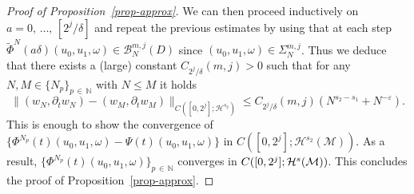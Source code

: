 \documentclass[10pt,a4paper]{article}
\newcommand{\N}{\mathbb{N}}
\newcommand{\B}{\mathcal{B}}
\newcommand{\M}{\mathcal{M}}
\renewcommand{\H}{\mathcal{H}}
\newcommand{\dl}{\delta}
\newcommand{\eps}{\varepsilon}
\newcommand{\Si}{\Sigma}
\newcommand{\wt}{\widetilde}
\newcommand{\dt}{\partial_t}
\renewcommand{\o}{\omega}
\begin{document}
\begin{proof}[Proof of Proposition~\ref{prop-approx}]
We can then proceed inductively on $a=0,\,\dots,\,[2^j/\dl]$ and repeat the previous estimates by using that at each step $\wt\Phi^N(a\dl)(u_0,u_1,\o)\in\B_N^{m,j}(D)$ since $(u_0,u_1,\o)\in \Si_N^{m,j}$. Thus we deduce that there exists a (large) constant $C_{2^j/\dl}(m,j)>0$ such that for any $N,M \in \{N_p\}_{p\,\in\,\N}$ with $N\le M$ it holds
\begin{equation}
\big\|(w_N, \dt w_N)-(w_M,\dt w_M)\big\|_{C\left([0,2^j];\H^{s_2}\right)} \le C_{2^j/\dl}(m,j)\left(N^{s_2-s_1}+N^{-\eps}\right).
\end{equation}
This is enough to show the convergence of $\{\Phi^{N_p}(t)(u_0,u_1,\o)-\Psi(t)(u_0,u_1,\o)\}$ in $C([0,2^j];\H^{s_2}(\M))$. As a result, $\big\{\Phi^{N_p}(t)(u_0,u_1,\o)\big\}_{p\,\in\,\N}$ converges in $C([0,2^j];\linebreak\H^s(\M))$. This concludes the proof of Proposition~\ref{prop-approx}.
\end{proof}
\end{document}
